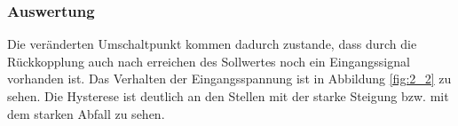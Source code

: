 \documentclass[12pt,a4paper]{article}
\begin{document}
\subsubsection*{Auswertung}

Die veränderten Umschaltpunkt kommen dadurch zustande, dass durch die Rückkopplung auch nach erreichen des Sollwertes noch ein Eingangssignal vorhanden ist. Das Verhalten der Eingangsspannung ist in Abbildung \ref{fig:2_2} zu sehen. Die Hysterese ist deutlich an den Stellen mit der starke Steigung bzw. mit dem starken Abfall zu sehen.
\end{document}
